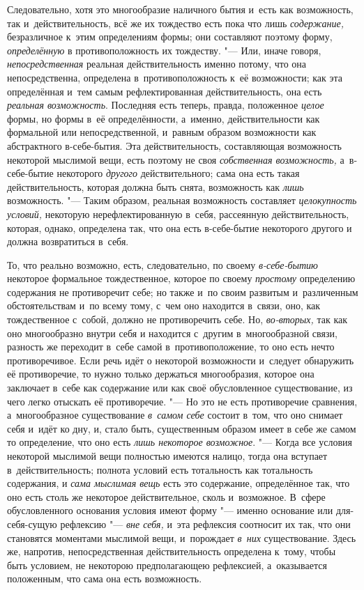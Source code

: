 Следовательно, хотя это многообразие наличного бытия и~есть как возможность,
так и~действительность, всё же их тождество есть пока что лишь
{\em содержание,} безразличное к~этим определениям
формы; они составляют поэтому форму, {\em определённую}
в противоположность их тождеству. "--- Или, иначе говоря,
{\em непосредственная} реальная действительность именно
потому, что она непосредственна, определена в~противоположность к~её
возможности; как эта определённая и~тем самым рефлектированная
действительность, она есть {\em реальная возможность}.
Последняя есть теперь, правда, положенное {\em целое}
формы, но формы в~её определённости, а~именно, действительности как
формальной или непосредственной, и~равным образом возможности как
абстрактного в-себе-бытия. Эта действительность, составляющая возможность
некоторой мыслимой вещи, есть поэтому не своя
{\em собственная возможность,} а~в-себе-бытие
некоторого {\em другого} действительного; сама она есть
такая действительность, которая должна быть снята, возможность как
{\em лишь} возможность. "--- Таким образом, реальная
возможность составляет {\em целокупность условий,}
некоторую нерефлектированную в~себя, рассеянную действительность, которая,
однако, определена так, что она есть в-себе-бытие некоторого другого и
должна возвратиться в~себя.

То, что реально возможно, есть, следовательно, по своему
{\em в-себе-бытию} некоторое формальное тождественное,
которое по своему {\em простому} определению содержания
не противоречит себе; но также и~по своим развитым и~различенным
обстоятельствам и~по всему тому, с~чем оно находится в~связи, оно, как
тождественное с~собой, должно не противоречить себе. Но,
{\em во-вторых,} так как оно многообразно внутри себя и
находится с~другим в~многообразной связи, разность же переходит в~себе
самой в~противоположение, то оно есть нечто противоречивое. Если речь идёт
о некоторой возможности и~следует обнаружить её противоречие, то нужно
только держаться многообразия, которое она заключает в~себе как содержание
или как своё обусловленное существование, из чего легко отыскать её
противоречие. "--- Но это не есть противоречие сравнения, а~многообразное
существование {\em в~самом себе} состоит в~том, что оно
снимает себя и~идёт ко дну, и, стало быть, существенным образом имеет в
себе же самом то определение, что оно есть {\em лишь
некоторое возможное}. "--- Когда все условия некоторой мыслимой вещи полностью
имеются налицо, тогда она вступает в~действительность; полнота условий есть
тотальность как тотальность содержания, и {\em сама
мыслимая вещь} есть это содержание, определённое так, что оно есть столь же
некоторое действительное, сколь и~возможное. В~сфере обусловленного
основания условия имеют форму "--- именно основание или для-себя-сущую
рефлексию "--- {\em вне себя,} и~эта рефлексия соотносит
их так, что они становятся моментами мыслимой вещи, и~порождает
{\em в~них} существование. Здесь же, напротив,
непосредственная действительность определена к~тому, чтобы быть условием,
не некоторою предполагающею рефлексией, а~оказывается положенным, что сама
она есть возможность.

